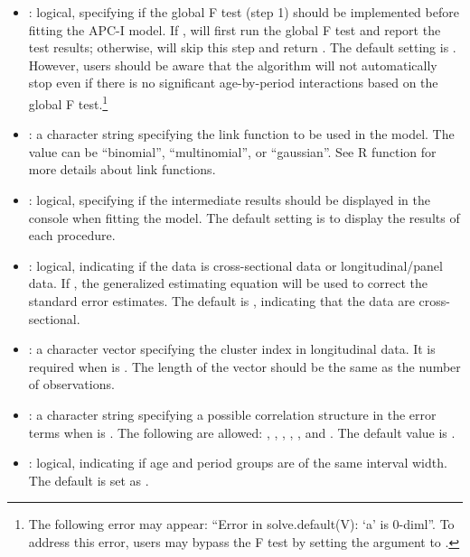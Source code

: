 \begin{itemize}
\item {}: logical, specifying if the global F test (step 1) should be implemented before fitting the APC-I model. If {}, {} will first run the global F test and report the test results; otherwise, {} will skip this step and return {}. The default setting is {}. However, users should be aware that the algorithm will not automatically stop even if there is no significant age-by-period interactions based on the global F test.\footnote{The following error may appear: ``Error in solve.default(V): `a' is 0-diml''. To address this error, users may bypass the F test by setting the argument  to {}.}

\item {}: a character string specifying the link function to be used in the model. The value can be ``binomial'', ``multinomial'', or ``gaussian''. See R function  for more details about link functions.

\item {}: logical, specifying if the intermediate results should be displayed in the console when fitting the model. The default setting is {} to display the results of each procedure.

\item {}: logical, indicating if the data is cross-sectional data or longitudinal/panel data. If {}, the generalized estimating equation will be used to correct the standard error estimates. The default is {}, indicating that the data are cross-sectional.

\item {}: a character vector specifying the cluster index in longitudinal data. It is required when {} is {}. The length of the vector should be the same as the number of observations.

\item {}: a character string specifying a possible correlation structure in the error terms when {} is {}. The following are allowed: {}, {}, {}, {}, {}, {} and {}. The default value is {}. 

 \item{}: logical, indicating if age and period groups are of the same interval width. The default is set as .
 

\end{itemize}
